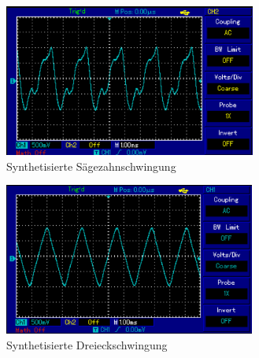 \begin{figure}[H]
  \centering
  \includegraphics[height=5cm]{saegezahn.PNG}
  \caption{Synthetisierte Sägezahnschwingung}
  \label{fig:saegezahn}
\end{figure}


\begin{figure}[H]
  \centering
  \includegraphics[height=5cm]{dreieck.PNG}
  \caption{Synthetisierte Dreieckschwingung}
  \label{fig:dreieck}
\end{figure}
